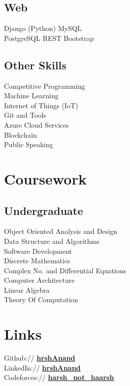 \documentclass[]{deedy-resume-openfont}
\begin{document}
\begin{minipage}[t]{0.33\textwidth}
\subsection{Web}
\textbullet{} Django (Python) \textbullet{} MySQL \\\textbullet{} PostgreSQL \textbullet{} REST \textbullet{} Bootstrap
\sectionsep
\subsection{Other Skills}
\textbullet{}Competitive Programming\\\textbullet{}Machine Learning\\\textbullet{}Internet of Things (IoT)\\ \textbullet{}Git and Tools\\\textbullet{}Azure Cloud Services\\\textbullet{}Blockchain\\\textbullet{}Public Speaking
\sectionsep

\section{Coursework}

\subsection{Undergraduate}
Object Oriented Analysis and Design \\
Data Structure and Algorithms \\
Software Development \\
Discrete Mathematics \\
Complex No. and Differential Equations \\
Computer Architecture \\
Linear Algebra\\
Theory Of Computation


\sectionsep


\section{Links} 
Github:// \href{https://github.com/hrshAnand}{\bf hrshAnand \faExternalLink} \\
LinkedIn://  \href{https://www.linkedin.com/in/hrshAnand}{\bf hrshAnand \faExternalLink} \\
Codeforces:// \href{http://codeforces.com/profile/harsh_not_haarsh}{\bf harsh\_not\_haarsh \faExternalLink}
\sectionsep


\end{minipage}
\end{document}
